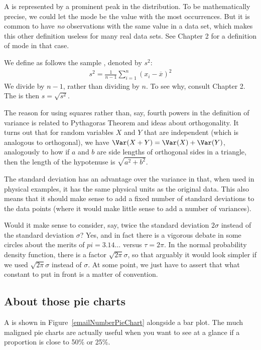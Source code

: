A  is represented by a prominent peak in the distribution. To be mathematically precise, we could let the mode be the value with the most occurrences. But it is common to have \emph{no} observations with the same value in a data set, which makes this other definition useless for many real data sets. See Chapter 2 for a definition of mode in that case.

\label{variability}

We define as follows the sample \label{varianceIsDefined}, denoted by $s_{}^2$:
\begin{align*}
s_{}^2 = \frac1{n-1}\sum_{i=1}^n (x_i-\overline x)^2
\end{align*}
We divide by $n-1$, rather than dividing by $n$. To see why, consult Chapter 2. The  is then $s=\sqrt{s^2}$.

The reason for using squares rather than, say, fourth powers in the definition of variance is related to Pythagoras Theorem and ideas about orthogonality.
It turns out that for random variables $X$ and $Y$ that are independent (which is analogous to orthogonal), we have $\Var(X+Y)=\Var(X)+\Var(Y)$, analogously to how if $a$ and $b$ are side lengths of orthogonal sides in a triangle, then the length of the hypotenuse is $\sqrt{a^2+b^2}$.

The standard deviation has an advantage over the variance in that, when used in physical examples, it has the same physical units as the original data. This also means that it should make sense to add a fixed number of standard deviations to the data points (where it would make little sense to add a number of variances).

Would it make sense to consider, say, twice the standard deviation $2\sigma$ instead of the standard deviation $\sigma$?
Yes, and in fact there is a vigorous debate in some circles about the merits of $pi=3.14\dots$ versus $\tau=2\pi$. In the normal probability density function, there is a factor $\sqrt{2\pi}\sigma$, so that arguably it would look simpler if we used $\sqrt{2\pi}\sigma$ instead of $\sigma$. At some point, we just have to assert that what constant to put in front is a matter of convention.

\subsection{About those pie charts}
A  is shown in Figure~\vref{emailNumberPieChart} alongside a bar plot.
The much maligned pie charts are actually useful when you want to see at a glance if a proportion is close to 50\% or 25\%.

